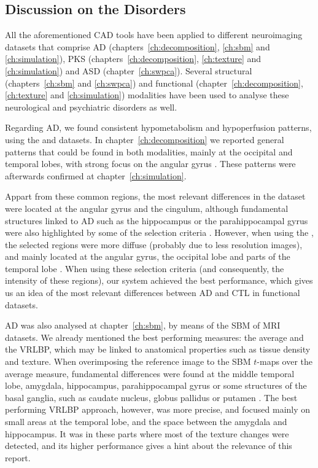 \subsection{Discussion on the Disorders}
All the aforementioned \ac{CAD} tools have been applied to different neuroimaging datasets that comprise \ac{AD} (chapters~\ref{ch:decomposition}, \ref{ch:sbm} and \ref{ch:simulation}), \ac{PKS} (chapters~\ref{ch:decomposition}, \ref{ch:texture} and \ref{ch:simulation}) and \ac{ASD} (chapter~\ref{ch:swpca}). Several structural (chapters~\ref{ch:sbm} and \ref{ch:swpca}) and functional (chapter~\ref{ch:decomposition}, \ref{ch:texture} and \ref{ch:simulation}) modalities have been used to analyse these neurological and psychiatric disorders as well. 

Regarding \ac{AD}, we found consistent hypometabolism and hypoperfusion patterns, using the \adnipet{} and \vdlnhmpao{} datasets. In chapter~\ref{ch:decomposition} we reported general patterns that could be found in both modalities, mainly at the occipital and temporal lobes, with strong focus on the angular gyrus \cite{Dubois2007,Claus1994}. These patterns were afterwards confirmed at chapter~\ref{ch:simulation}. 

Appart from these common regions, the most relevant differences in the \adnipet{} dataset were located at the angular gyrus and the cingulum, although fundamental structures linked to \ac{AD} such as the hippocampus or the parahippocampal gyrus were also highlighted by some of the selection criteria \cite{Stoeckel04,Illan2011}. However, when using the \vdlnhmpao{}, the selected regions were more diffuse (probably due to less resolution images), and mainly located at the angular gyrus, the occipital lobe and parts of the temporal lobe \cite{Dubois2007,Claus1994}. When using these selection criteria (and consequently, the intensity of these regions), our system achieved the best performance, which gives us an idea of the most relevant differences between \ac{AD} and \ac{CTL} in functional datasets. 

\ac{AD} was also analysed at chapter~\ref{ch:sbm}, by means of the \ac{SBM} of \ac{MRI} datasets. We already mentioned the best performing measures: the average and the \ac{VRLBP}, which may be linked to anatomical properties such as tissue density and texture. When overimposing the reference image to the \ac{SBM} $t$-maps over the average measure, fundamental differences were found at the middle temporal lobe, amygdala, hippocampus, parahippocampal gyrus or some structures of the basal ganglia, such as caudate nucleus, globus pallidus or putamen \cite{Dubois2007,Pievani2013}. The best performing \ac{VRLBP} approach, however, was more precise, and focused mainly on small areas at the temporal lobe, and the space between the amygdala and hippocampus. It was in these parts where most of the texture changes were detected, and its higher performance gives a hint about the relevance of this report. 

